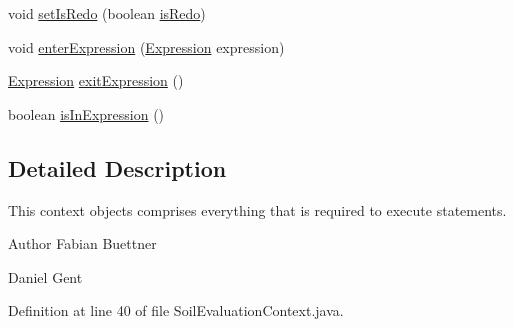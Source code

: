 \begin{DoxyCompactItemize}
void \hyperlink{classorg_1_1tzi_1_1use_1_1uml_1_1sys_1_1soil_1_1_soil_evaluation_context_a34c61878dec976c7cff16acd8ced102e}{set\-Is\-Redo} (boolean \hyperlink{classorg_1_1tzi_1_1use_1_1uml_1_1sys_1_1soil_1_1_soil_evaluation_context_a59dc582118f6195ce909ba7e4127f7e2}{is\-Redo})
\item 
void \hyperlink{classorg_1_1tzi_1_1use_1_1uml_1_1sys_1_1soil_1_1_soil_evaluation_context_aad0923d79d07d9b58fd1722d04141c1d}{enter\-Expression} (\hyperlink{classorg_1_1tzi_1_1use_1_1uml_1_1ocl_1_1expr_1_1_expression}{Expression} expression)
\item 
\hyperlink{classorg_1_1tzi_1_1use_1_1uml_1_1ocl_1_1expr_1_1_expression}{Expression} \hyperlink{classorg_1_1tzi_1_1use_1_1uml_1_1sys_1_1soil_1_1_soil_evaluation_context_a535fcabd6098ec31d4367f587dce7293}{exit\-Expression} ()
\item 
boolean \hyperlink{classorg_1_1tzi_1_1use_1_1uml_1_1sys_1_1soil_1_1_soil_evaluation_context_a4ebc91643441ddce5c0980c5d583261f}{is\-In\-Expression} ()
\end{DoxyCompactItemize}


\subsection{Detailed Description}
This context objects comprises everything that is required to execute statements.

\begin{DoxyAuthor}{Author}
Fabian Buettner 

Daniel Gent 
\end{DoxyAuthor}


Definition at line 40 of file Soil\-Evaluation\-Context.\-java.



